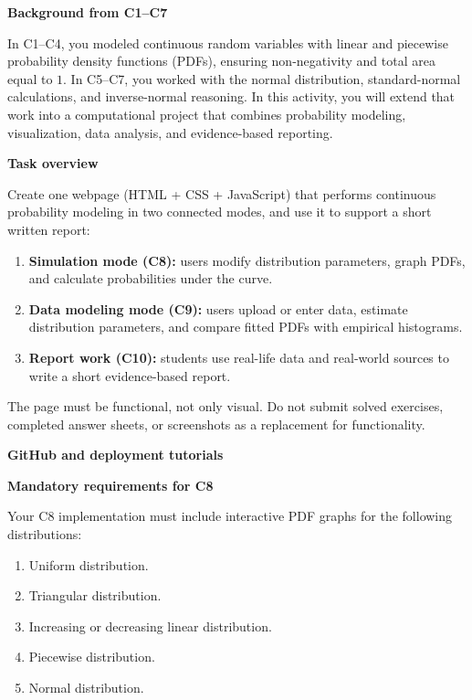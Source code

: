 \documentclass[12pt]{article}
\newcommand{\SubsectionBox}[1]{%
	\noindent\colorbox{gray!30}{%
		\parbox{\linewidth}{\textbf{#1}}%
	}\par\vspace{0.35cm}%
}
\begin{document}
	\vspace{0.25cm}
	
	\SubsectionBox{Background from C1--C7}
	In C1--C4, you modeled continuous random variables with linear and piecewise probability density functions (PDFs), ensuring non-negativity and total area equal to \(1\). In C5--C7, you worked with the normal distribution, standard-normal calculations, and inverse-normal reasoning. In this activity, you will extend that work into a computational project that combines probability modeling, visualization, data analysis, and evidence-based reporting.
	
	\SubsectionBox{Task overview}
	Create one webpage (HTML + CSS + JavaScript) that performs continuous probability modeling in two connected modes, and use it to support a short written report:
	\begin{enumerate}
		\item \textbf{Simulation mode (C8):} users modify distribution parameters, graph PDFs, and calculate probabilities under the curve.
		\item \textbf{Data modeling mode (C9):} users upload or enter data, estimate distribution parameters, and compare fitted PDFs with empirical histograms.
		\item \textbf{Report work (C10):} students use real-life data and real-world sources to write a short evidence-based report.
	\end{enumerate}
	The page must be functional, not only visual. Do not submit solved exercises, completed answer sheets, or screenshots as a replacement for functionality.
	
	\SubsectionBox{GitHub and deployment tutorials}
	\noindent{}
	
	\vspace{0.35cm}
	
	\SubsectionBox{Mandatory requirements for C8}
	Your C8 implementation must include interactive PDF graphs for the following distributions:
	\begin{enumerate}
		\item Uniform distribution.
		\item Triangular distribution.
		\item Increasing or decreasing linear distribution.
		\item Piecewise distribution.
		\item Normal distribution.
	\end{enumerate}
	
\end{document}

